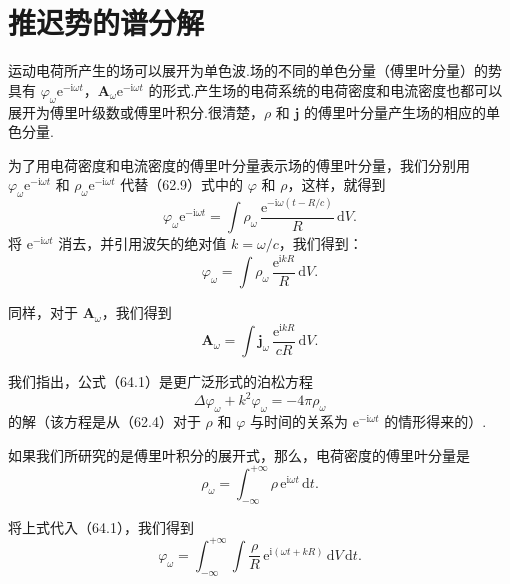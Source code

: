 \section{推迟势的谱分解}

运动电荷所产生的场可以展开为单色波.场的不同的单色分量（傅里叶分量）的势具有 $\varphi_\omega\mathrm{e}^{-\mathrm{i}\omega t}$，$\boldsymbol{A}_\omega\mathrm{e}^{-\mathrm{i}\omega t}$ 的形式.产生场的电荷系统的电荷密度和电流密度也都可以展开为傅里叶级数或傅里叶积分.很清楚，$\rho$ 和 $\boldsymbol{j}$ 的傅里叶分量产生场的相应的单色分量.

为了用电荷密度和电流密度的傅里叶分量表示场的傅里叶分量，我们分别用 $\varphi_\omega\mathrm{e}^{-\mathrm{i}\omega t}$ 和 $\rho_\omega\mathrm{e}^{-\mathrm{i}\omega t}$ 代替（62.9）式中的 $\varphi$ 和 $\rho$，这样，就得到
\begin{equation*}
  \varphi_\omega\mathrm{e}^{-\mathrm{i}\omega t}
  =\int\rho_\omega\,\frac{\mathrm{e}^{-\mathrm{i}\omega(t-R/c)}}{R}\,\mathrm{d}V.
\end{equation*}
将 $\mathrm{e}^{-\mathrm{i}\omega t}$ 消去，并引用波矢的绝对值 $k=\omega/c$，我们得到：
\begin{equation}
  \varphi_\omega=\int\rho_\omega\,\frac{\mathrm{e}^{\mathrm{i}kR}}{R}\,\mathrm{d}V.
\end{equation}

同样，对于 $\boldsymbol{A}_\omega$，我们得到
\begin{equation}
  \boldsymbol{A}_\omega=\int\boldsymbol{j}_\omega\,
  \frac{\mathrm{e}^{\mathrm{i}kR}}{cR}\,\mathrm{d}V.
\end{equation}

我们指出，公式（64.1）是更广泛形式的泊松方程
\begin{equation}
  \Delta\varphi_\omega+k^2\varphi_\omega=-4\pi\rho_\omega
\end{equation}
的解（该方程是从（62.4）对于 $\rho$ 和 $\varphi$ 与时间的关系为 $\mathrm{e}^{-\mathrm{i}\omega t}$ 的情形得来的）.

如果我们所研究的是傅里叶积分的展开式，那么，电荷密度的傅里叶分量是
\begin{equation*}
  \rho_\omega=\int_{-\infty}^{+\infty}\rho\,\mathrm{e}^{\mathrm{i}\omega t}\,\mathrm{d}t.
\end{equation*}

将上式代入（64.1），我们得到
\begin{equation}
  \varphi_\omega=\int_{-\infty}^{+\infty}\int
  \frac{\rho}{R}\,\mathrm{e}^{\mathrm{i}(\omega t+kR)}\,\mathrm{d}V\,\mathrm{d}t.
\end{equation}

